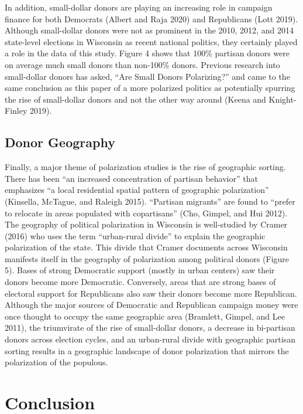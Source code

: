 \documentclass[12pt,]{article}
\begin{document}
In addition, small-dollar donors are playing an increasing role in
campaign finance for both Democrats (Albert and Raja 2020) and
Republicans (Lott 2019). Although small-dollar donors were not as
prominent in the 2010, 2012, and 2014 state-level elections in Wisconsin
as recent national politics, they certainly played a role in the data of
this study. Figure 4 shows that 100\% partisan donors were on average
much small donors than non-100\% donors. Previous research into
small-dollar donors has asked, ``Are Small Donors Polarizing?'' and came
to the same conclusion as this paper of a more polarized politics as
potentially spurring the rise of small-dollar donors and not the other
way around (Keena and Knight-Finley 2019).

\hypertarget{donor-geography}{%
\subsection{Donor Geography}\label{donor-geography}}

Finally, a major theme of polarization studies is the rise of geographic
sorting. There has been ``an increased concentration of partisan
behavior'' that emphasizes ``a local residential spatial pattern of
geographic polarization'' (Kinsella, McTague, and Raleigh 2015).
``Partisan migrants'' are found to ``prefer to relocate in areas
populated with copartisans'' (Cho, Gimpel, and Hui 2012). The geography
of political polarization in Wisconsin is well-studied by Cramer (2016)
who uses the term ``urban-rural divide'' to explain the geographic
polarization of the state. This divide that Cramer documents across
Wisconsin manifests itself in the geography of polarization among
political donors (Figure 5). Bases of strong Democratic support (mostly
in urban centers) saw their donors become more Democratic. Conversely,
areas that are strong bases of electoral support for Republicans also
saw their donors become more Republican. Although the major sources of
Democratic and Republican campaign money were once thought to occupy the
same geographic area (Bramlett, Gimpel, and Lee 2011), the triumvirate
of the rise of small-dollar donors, a decrease in bi-partisan donors
across election cycles, and an urban-rural divide with geographic
partisan sorting results in a geographic landscape of donor polarization
that mirrors the polarization of the populous.

\hypertarget{conclusion}{%
\section{Conclusion}\label{conclusion}}
\end{document}
